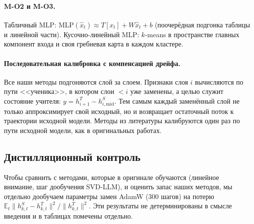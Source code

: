 \paragraph{M-O2 и M-O3.} Табличный MLP:
$\mathrm{MLP}(\hat x_t)\approx T[x_t]+W\hat x_t+b$ (поочерёдная подгонка
таблицы и линейной части). Кусочно-линейный MLP: $k$-means в
пространстве главных компонент входа и своя гребневая карта в каждом
кластере.

\paragraph{Последовательная калибровка с компенсацией дрейфа.}
Все наши методы подгоняются слой за слоем. Признаки слоя $i$
вычисляются по пути <<ученика>>, в котором слои $<i$ уже заменены, а
целью служит состояние учителя: $y=h^{T}_{i+1}-h^{S}_{i,\mathrm{mid}}$.
Тем самым каждый заменённый слой не только аппроксимирует свой
исходный, но и возвращает остаточный поток к траектории исходной
модели. Методы из литературы калибруются один раз по пути исходной
модели, как в оригинальных работах.

\subsection{Дистилляционный контроль}
Чтобы сравнить с методами, которые в оригинале обучаются (линейное
внимание, шаг дообучения SVD-LLM), и оценить запас наших методов, мы
отдельно дообучаем параметры замен AdamW (300 шагов) на потерю
$\mathbb E_t\|h^S_{k,t}-h^T_{k,t}\|^2/\|h^T_{k,t}\|^2$. Эти результаты не
детерминированы в смысле введения и в таблицах помечены отдельно.
